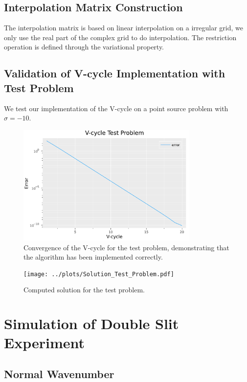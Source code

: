 \documentclass[a4paper,12pt]{article}
\begin{document}
\subsection{Interpolation Matrix Construction}

The interpolation matrix is based on linear interpolation on a irregular grid, we only use
the real part of the complex grid to do interpolation. The restriction operation is defined
through the variational property.

\subsection{Validation of V-cycle Implementation with Test Problem}

We test our implementation of the V-cycle on a point source problem with $\sigma = -10$.

\begin{figure}[h!]
    \centering
    \includegraphics[width=0.8\textwidth]{../plots/Vcycle_Test_Problem.pdf}
    \caption{Convergence of the V-cycle for the test problem, demonstrating that the algorithm has been implemented correctly.}
    \label{fig:../plots/Vcycle_Test_Problem.pdf}
\end{figure}

\begin{figure}[h!]
    \centering
    \texttt{[image: ../plots/Solution\_Test\_Problem.pdf]}
    \caption{Computed solution for the test problem.}
    \label{fig:Solution_Test_Problem}
\end{figure}

\section{Simulation of Double Slit Experiment}
\subsection{Normal Wavenumber}
\end{document}
